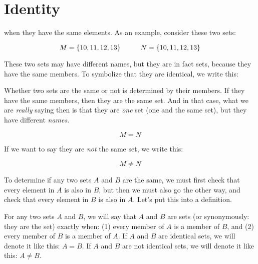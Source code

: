 \documentclass[../../../main.tex]{subfiles}
\begin{document}
\section{Identity}
\label{sec:set-equality}

 when they have the same elements. As an example, consider these two sets:

\begin{equation*}
  M = \{ 10, 11, 12, 13 \} \hskip 1cm N = \{ 10, 11, 12, 13 \}
\end{equation*}

These two sets may have different names, but they are in fact  sets, because they have the same members. To symbolize that they are identical, we write this:

\begin{aside}
  \begin{remark}
    Whether two sets are the same or not is determined by their members. If they have the same members, then they are the same set. And in that case, what we are \emph{really} saying then is that they are \emph{one} set (one and the same set), but they have different \emph{names}.
  \end{remark}
\end{aside}

\begin{equation*}
  M = N
\end{equation*}

If we want to say they are \emph{not} the same set, we write this:

\begin{equation*}
  M \not = N
\end{equation*}

To determine if any two sets $A$ and $B$ are the same, we must first check that every element in $A$ is also in $B$, but then we must also go the other way, and check that every element in $B$ is also in $A$. Let's put this into a definition.

\begin{fdefinition}
  \label{def:set-identity}
  For any two sets $A$ and $B$, we will say that $A$ and $B$ are  sets (or synonymously: they are the  set) exactly when: (1) every member of $A$ is a member of $B$, and (2) every member of $B$ is a member of $A$. If $A$ and $B$ are identical sets, we will denote it like this: $A = B$. If $A$ and $B$ are not identical sets, we will denote it like this: $A \not = B$.
\end{fdefinition}
\end{document}
